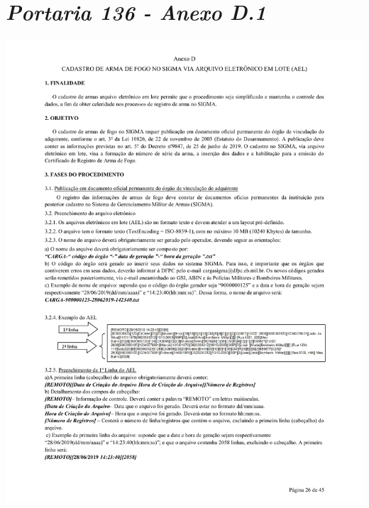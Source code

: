 \chapter{\textit{Portaria 136 - Anexo D.1}}
\label{sec:anexoA1}

\includegraphics[scale=0.8]{imagens/AnexoA1-AnexoD-portaria-136}



